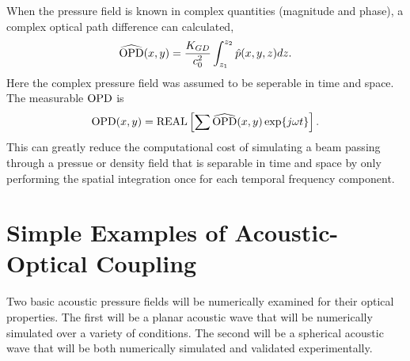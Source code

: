 When the pressure field is known in complex quantities (magnitude and phase), a complex optical path difference can calculated,
\begin{equation}
  \widehat{\operatorname{OPD}}(x,y) = \frac{K_{GD}}{c_0^2}\int_{z_1}^{z_2} \hat{p}(x,y,z)dz \textrm{.}
  \label{eqn:03_opd_complex}
\end{equation}
Here the complex pressure field was assumed to be seperable in time and space.
The measurable $\operatorname{OPD}$ is
\begin{equation}
  \operatorname{OPD}(x,y) = \operatorname{REAL}\left[\sum\widehat{\operatorname{OPD}}(x,y)\exp\{j\omega t\}\right] \textrm{.}
  \label{eqn:03_opd_real}
\end{equation}
This can greatly reduce the computational cost of simulating a beam passing through a pressue or density field that is separable in time and space by only performing the spatial integration once for each temporal frequency component.

\section{Simple Examples of Acoustic-Optical Coupling}
Two basic acoustic pressure fields will be numerically examined for their optical properties.
The first will be a planar acoustic wave that will be numerically simulated over a variety of conditions.
The second will be a spherical acoustic wave that will be both numerically simulated and validated experimentally.

